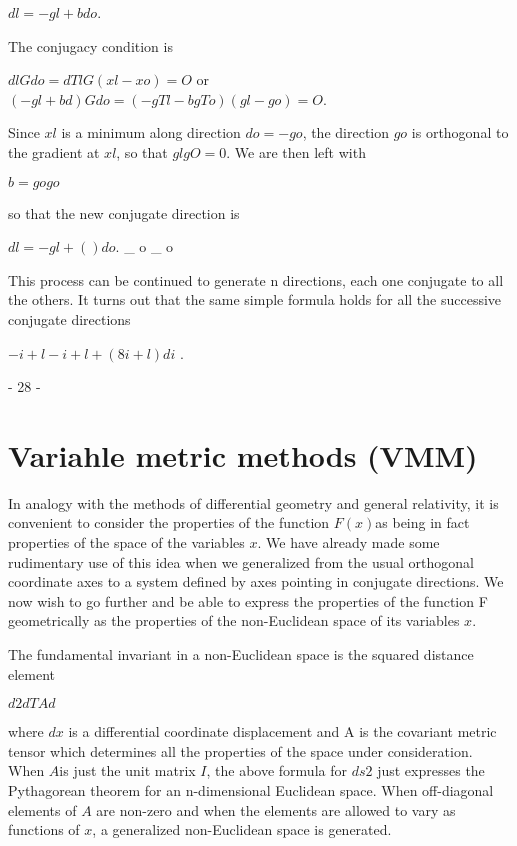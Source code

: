                              $dl = -gl + bdo $.
 
The conjugacy condition is
 
                        $dlGdo = dTlG(xl - xo) = O$
or
                $(-gl + bd)Gdo = (-gTl - bgTo)(gl - go) = O $.
 
Since $xl$ is a minimum along direction $do = -go$, the direction $go$ is
orthogonal to the gradient at $xl$, so that $glgO = 0$.  We are then left
with
 
                               $b =
                                    gogo$
 
so that the new conjugate direction is
 
                      $dl = -gl + () do $.
                                _ o _ o
 
This process can be continued to generate n directions, each one conjugate
to all the others.  It turns out that the same simple formula holds
for all the successive conjugate directions
 
                  $-i+l -i+l + (8i+l) di$ .
 
                                 - 28 -
 
\section{Variahle metric methods (VMM)}
 
     In analogy with the methods of differential geometry and general
relativity, it is convenient to consider the properties of the function
$F(x)$as being in fact properties of the space of the variables $x$. We
have already made some rudimentary use of this idea when we generalized
from the usual orthogonal coordinate axes to a system defined by axes
pointing in conjugate directions.  We now wish to go further and be able
to express the properties of the function F geometrically as the properties of the non-Euclidean space of its variables $x.$
 
     The fundamental invariant in a non-Euclidean space is the squared
distance element
 
                               $d 2   d TAd$
 
where $dx$ is a differential coordinate displacement and A is the
covariant
metric tensor which determines all the properties of the space under
consideration. When $A$is just the unit matrix $I$, the above formula for
$ds2$ just expresses the Pythagorean theorem for an n-dimensional
Euclidean
space. When off-diagonal elements of $A$ are non-zero and when the
elements are allowed to vary as functions of $x$, a generalized
non-Euclidean space is generated.
 
